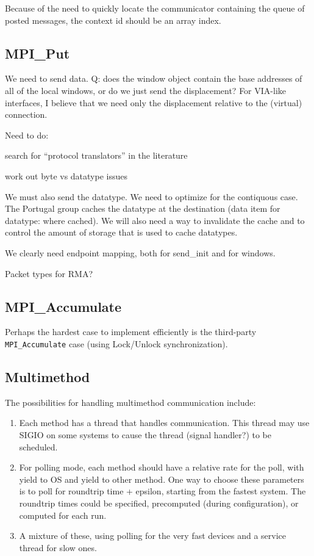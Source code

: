 \documentclass{article}
\let\code=\texttt
\begin{document}
Because of the need to quickly locate the communicator containing the queue of
posted messages, the context id should be an array index.

\subsection{MPI\_Put}
We need to send data.  Q: does the window object contain the base addresses of
all of the local windows, or do we just send the displacement?  For VIA-like
interfaces, I believe that we need only the displacement relative to the
(virtual) connection.

Need to do:

search for ``protocol translators'' in the literature

work out byte vs datatype issues

We must also send the datatype.  We need to optimize for the contiquous case.
The Portugal group caches the datatype at the destination (data item for
datatype: where cached).  We will also need a way to invalidate the cache and
to control the amount of storage that is used to cache datatypes.

We clearly need endpoint mapping, both for send\_init and for windows.

Packet types for RMA?

\subsection{MPI\_Accumulate}
Perhaps the hardest case to implement efficiently is the third-party
\code{MPI\_Accumulate} case (using Lock/Unlock synchronization).

\subsection{Multimethod}

The possibilities for handling multimethod communication include:
\begin{enumerate}
\item Each method has a thread that handles communication.  This thread may
  use SIGIO on some systems to cause the thread (signal handler?) to be
  scheduled. 
\item For polling mode, each method should have a relative rate for the poll,
  with yield to OS and yield to other method.  One way to choose these
  parameters is to poll for roundtrip time + epsilon, starting from the
  fastest system.  The roundtrip times could be specified, precomputed (during
  configuration), or computed for each run.
\item A mixture of these, using polling for the very fast devices and a
  service thread for slow ones.
\end{enumerate}
\end{document}
